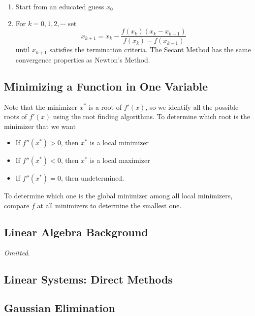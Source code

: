 \documentclass[12pt]{scrartcl}
\begin{document}
\begin{note}
  \hfill

  \begin{enumerate}
    \item Start from an educated guess $x_0$
    \item For $k = 0, 1, 2, \cdots$ set 
    \[x_{k+1} = x_k - \frac{f(x_k)(x_k - x_{k-1})}{f(x_k) - f(x_{k-1})}\]
    until $x_{k+1}$ satisfies the termination criteria. The Secant Method has the same convergence properties 
    as Newton's Method.
  \end{enumerate}
\end{note}

\subsection{Minimizing a Function in One Variable}

\begin{note}
  Note that the minimizer $x^*$ is a root of $f'(x)$, so we identify all the possible roots 
  of $f'(x)$ using the root finding algorithms. To determine which root is the minimizer that we want 
  \begin{itemize}
    \item If $f''(x^*) > 0$, then $x^*$ is a local minimizer
    \item If $f''(x^*) < 0$, then $x^*$ is a local maximizer
    \item If $f''(x^*) = 0$, then undetermined. 
  \end{itemize}
  To determine which one is the global minimizer among all local minimizers, compare $f$ at all minimizers 
  to determine the smallest one. 
\end{note}

\subsection{Linear Algebra Background}

\textit{Omitted}.

\subsection{Linear Systems: Direct Methods}

\subsection{Gaussian Elimination}
\end{document}
